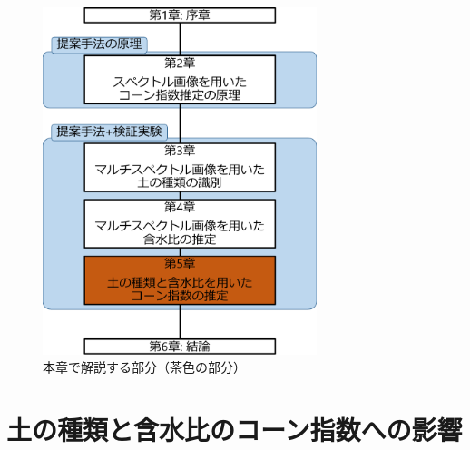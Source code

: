 \begin{figure}[p]
      \begin{center}
      \centering
      \includegraphics[width=8cm]{./Ch5_ConeIndexEstimation/Fig/thesis_constitution_ch5_compressed.pdf}
      \caption{本章で解説する部分（茶色の部分）}\label{fig:thesis_constitution_ch5}
      \end{center}
\end{figure}

\clearpage


\section{土の種類と含水比のコーン指数への影響}
\label{sec:InfluenceOfSoilTypeAndWaterContentToConeIndex}

